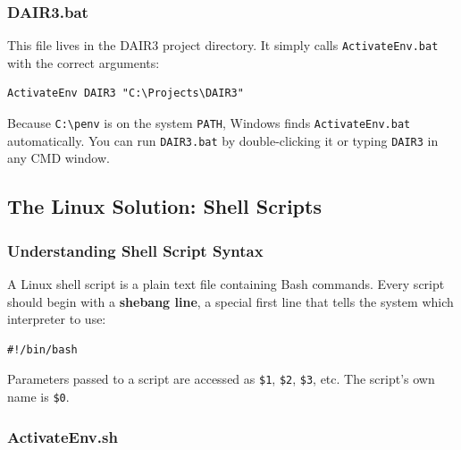 \subsubsection{DAIR3.bat}

This file lives in the DAIR3 project directory. It simply calls
\texttt{ActivateEnv.bat} with the correct arguments:

\begin{lstlisting}[style=windowsStyle, caption={\texttt{DAIR3.bat}: Project launcher (Windows)}]
ActivateEnv DAIR3 "C:\Projects\DAIR3"
\end{lstlisting}

Because \texttt{C:\textbackslash penv} is on the system \texttt{PATH},
Windows finds \texttt{ActivateEnv.bat} automatically. You can run
\texttt{DAIR3.bat} by double-clicking it or typing \texttt{DAIR3} in any
CMD window.

\subsection{The Linux Solution: Shell Scripts}
\label{subsec:linux-scripts}

\subsubsection{Understanding Shell Script Syntax}

A Linux shell script is a plain text file containing Bash commands. Every
script should begin with a \textbf{shebang line}, a special first line that
tells the system which interpreter to use:

\begin{lstlisting}[style=linuxStyle]
#!/bin/bash
\end{lstlisting}

Parameters passed to a script are accessed as \texttt{\$1}, \texttt{\$2},
\texttt{\$3}, etc. The script's own name is \texttt{\$0}.

\subsubsection{ActivateEnv.sh}

